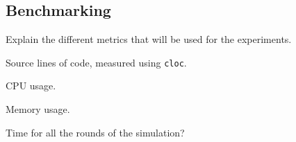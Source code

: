 \subsection{Benchmarking}

Explain the different metrics that will be used for the experiments.

Source lines of code, measured using \verb|cloc|.

CPU usage.

Memory usage.

Time for all the rounds of the simulation?
